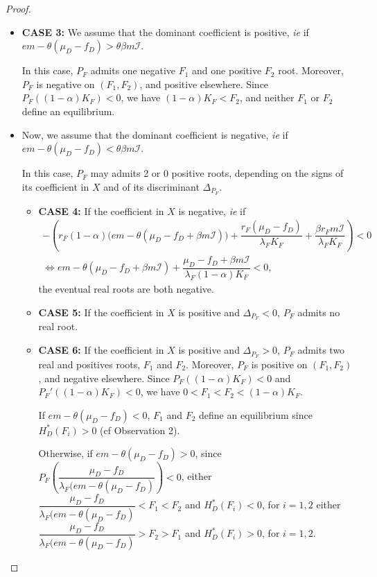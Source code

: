 \documentclass{article}
\newcommand{\lfw}{\lambda_{F}}
\newcommand{\lfw}{\lambda_{F}}
\newcommand{\cI}{\mathcal{I}}
\begin{document}
\begin{proof}
\begin{itemize}
\begin{itemize}
\item \textbf{CASE 3: } We assume that the dominant coefficient is positive, \textit{ie} if $em - \theta (\mu_D - f_D) > \theta \beta m \cI$.

In this case, $P_F$ admits one negative $F_1$ and one positive $F_2$ root. Moreover, $P_F$ is negative on $(F_1, F_2)$, and positive elsewhere. Since $P_F((1-\alpha) K_F) < 0$, we have $(1-\alpha) K_F < F_2$, and neither $F_1$ or $F_2$ define an equilibrium.

\item Now, we assume that the dominant coefficient is negative, \textit{ie} if $em - \theta (\mu_D - f_D) < \theta \beta m \cI$.

In this case, $P_F$ may admits 2 or 0 positive roots, depending on the signs of its coefficient in $X$ and of its discriminant $\Delta_{P_F}$.
\begin{itemize}
\item \textbf{CASE 4: }If the coefficient in $X$ is negative, \textit{ie} if 
\begin{multline*}
- \left(r_F (1-\alpha)   \Big(em - \theta(\mu_D-f_D + \beta m \cI)  \Big) + \dfrac{r_F(\mu_D-f_D)}{\lfw K_F} + \dfrac{\beta r_F m \cI}{\lfw K_F}\right) < 0 \\
\Leftrightarrow em - \theta(\mu_D-f_D + \beta m \cI) + \dfrac{\mu_D-f_D + \beta m \cI}{\lfw (1- \alpha) K_F} < 0,
\end{multline*}
the eventual real roots are both negative.
\item \textbf{CASE 5: }If the coefficient in $X$ is positive and $\Delta_{P_F} < 0$, $P_F$ admits no real root.

\item \textbf{CASE 6: }If the coefficient in $X$ is positive and $\Delta_{P_F} > 0$, $P_F$ admits two real and positives roots, $F_1$ and $F_2$. Moreover, $P_F$ is positive on $(F_1, F_2)$, and negative elsewhere. Since $P_F((1-\alpha) K_F) < 0$ and $P_F'((1-\alpha) K_F) < 0$, we have $0 < F_1 < F_2 < (1-\alpha) K_F$.

\medskip

If $e m - \theta(\mu_D - f_D) < 0$, $F_1$ and $F_2$ define an equilibrium since $H_D^*(F_i) > 0$ (cf Observation 2). 

Otherwise, if $e m - \theta(\mu_D - f_D)  > 0$, since $P_F\left(\dfrac{\mu_D - f_D}{\lfw \Big(e m - \theta (\mu_D - f_D)} \right) < 0$, either $\dfrac{\mu_D - f_D}{\lfw \Big(e m - \theta (\mu_D - f_D)} < F_1 < F_2$ and $H_D^*(F_i) < 0$, for $i = 1,2$ either $\dfrac{\mu_D - f_D}{\lfw \Big(e m - \theta (\mu_D - f_D)} > F_2 > F_1$ and $H_D^*(F_i) > 0$, for $i = 1,2$. 


\end{itemize}
\end{itemize}
\end{itemize}
\end{proof}
\end{document}

